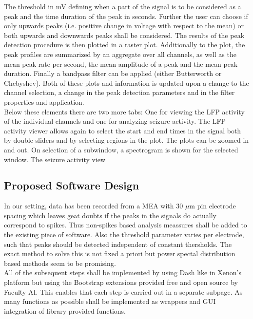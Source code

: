 \documentclass[a4paper]{article}
\begin{document}
        The threshold in mV defining when a part of the signal is to be considered as a peak and the time duration of the peak in seconds.
        Further the user can choose if only upwards peaks (i.e. positive change in voltage with respect to the mean) or both upwards and downwards peaks shall be considered.
        The results of the peak detection procedure is then plotted in a raster plot. 
        Additionally to the plot, the peak profiles are summarized by an aggregate over all channels, as well as the mean peak rate per second, the mean amplitude of a peak and the mean peak duration.
        Finally a bandpass filter can be applied (either Butterworth or Chebyshev).
        Both of these plots and information is updated upon a change to the channel selection, a change in the peak detection parameters and in the filter properties and application. \\
        Below these elements there are two more tabs: One for viewing the LFP activity of the individual channels and one for analyzing seizure activity.
        The LFP activity viewer allows again to select the start and end times in the signal both by double sliders and by selecting regions in the plot. 
        The plots can be zoomed in and out. 
        On selection of a subwindow, a spectrogram is shown for the selected window.
        The seizure activity view 
			
			

	\subsection{Proposed Software Design}
		In our setting, data has been recorded from a MEA with 30 $\mu$m pin electrode spacing which leaves geat doubts if the peaks in the signals do actually correspond to spikes.
		Thus non-spikes based analysis meassures shall be added to the existing piece of software.
		Also the threshold parameter varies per electrode, such that peaks should be detected independent of constant thersholds.
		The exact method to solve this is not fixed a priori but power spectal distribution based methods seem to be promising. \\
		All of the subsequent steps shall be implemented by using Dash like in Xenon's platform but using the Bootstrap extensions provided free and open source by Faculty AI. 
		This enables that each step is carried out in a separate subpage. 
		As many functions as possible shall be implemented as wrappers and GUI integration of library provided functions. \\
		
\end{document}
